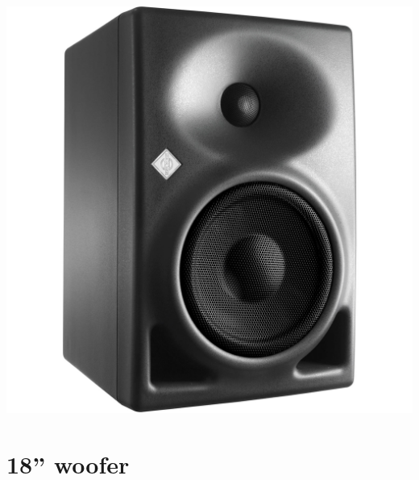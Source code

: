 \documentclass{report}
\begin{document}
\begin{appendices}
\begin{minipage}{0.6\textwidth}
\end{minipage}
\begin{minipage}{0.4\textwidth}
\begin{center}
	\includegraphics[scale=0.05]{Appendix/Studio}
    \captionsetup{hypcap=false}
    \label{fig:StudioMon}
\end{center}
\end{minipage}


\section{18'' woofer}


\end{appendices}
\end{document}
